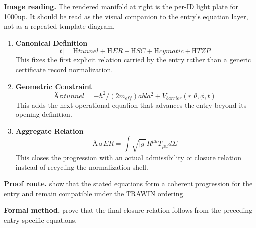 \begin{samepage}
\noindent\begin{minipage}[t]{0.45\linewidth}
\vspace{0pt}
\raggedright
\scriptsize\textbf{Image reading.} The rendered manifold at right is the per-ID light plate for 1000up. It should be read as the visual companion to the entry's equation layer, not as a repeated template diagram.\par
\end{minipage}\hfill
\begin{minipage}[t]{0.53\linewidth}
\vspace*{-0.10in}
\raggedright
{}
\end{minipage}
\end{samepage}

\clearpage


\begin{enumerate}[leftmargin=1.6em,itemsep=9pt,topsep=6pt]
\item \textbf{Canonical Definition}
\[
t] = Ĥtunnel + ĤER + ĤSC + Ĥcymatic + ĤTZP
\]
This fixes the first explicit relation carried by the entry rather than a generic certificate record normalization.

\item \textbf{Geometric Constraint}
\[
Ä¤tunnel = -\hbar^2/(2 m_{eff})  abla^2 + V_{barrier}(r, \theta, \phi, t)
\]
This adds the next operational equation that advances the entry beyond its opening definition.

\item \textbf{Aggregate Relation}
\[
Ä¤ER = \int \sqrt{|g|} R^{\mu u} T_{\mu u} d\Sigma
\]
This closes the progression with an actual admissibility or closure relation instead of recycling the normalization shell.
\end{enumerate}

\textbf{Proof route.} show that the stated equations form a coherent progression for the entry and remain compatible under the TRAWIN ordering.

\textbf{Formal method.} prove that the final closure relation follows from the preceding entry-specific equations.

\medskip
{}

